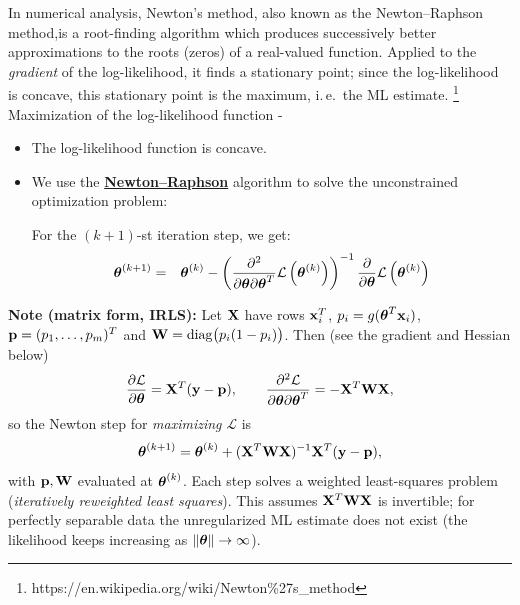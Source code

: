   In numerical analysis, Newton's method, also known as the Newton–Raphson method,is a root-finding algorithm which produces successively better approximations to the roots (zeros) of a real-valued function. Applied to the \emph{gradient} of the log-likelihood, it finds a stationary point; since the log-likelihood is concave, this stationary point is the maximum, i.\,e.\ the ML estimate. \footnote{https://en.wikipedia.org/wiki/Newton\%27s\_method}
 Maximization of the log-likelihood function -
   \begin{itemize}
    \item The log-likelihood function is concave.
    \item We use the \href{http://www.stat.washington.edu/quinn/classes/560/Newton.pdf}{\textbf{Newton--Raphson}} algorithm to solve the unconstrained optimization problem:
    
      For the $(k+1)$-st iteration step, we get:
%
      \begin{eqnarray*}
        \bm{\mathrm{\theta}}^{(k+1)} &=& \bm{\mathrm{\theta}}^{(k)} - \left(  \frac{\partial^2}{\partial\bm{\mathrm{\theta}} \partial \bm{\mathrm{\theta}}^T} \mathcal{L} \left(\bm{\mathrm{\theta}}^{(k)} \right)  \right)^{-1}   
       \frac{\partial}{\partial\bm{\mathrm{\theta}}} \mathcal{L}\left(\bm{\mathrm{\theta}}^{(k)}\right)
      \end{eqnarray*}
  \end{itemize}
  \textbf{Note (matrix form, IRLS):} Let $\mathbf{X}$ have rows $\bm{\mathrm{x}}_i^T$, $p_i=g(\bm{\mathrm{\theta}}^T\bm{\mathrm{x}}_i)$, $\bm{\mathrm{p}}=(p_1,\dots,p_m)^T$ and $\mathbf{W}=\mathrm{diag}\big(p_i(1-p_i)\big)$. Then (see the gradient and Hessian below)
  \begin{displaymath}
    \frac{\partial\mathcal L}{\partial\bm{\mathrm{\theta}}}=\mathbf{X}^T(\bm{\mathrm{y}}-\bm{\mathrm{p}}),\qquad
    \frac{\partial^2\mathcal L}{\partial\bm{\mathrm{\theta}}\partial\bm{\mathrm{\theta}}^T}=-\mathbf{X}^T\mathbf{W}\mathbf{X},
  \end{displaymath}
  so the Newton step for \emph{maximizing} $\mathcal L$ is
  \begin{displaymath}
    \bm{\mathrm{\theta}}^{(k+1)}=\bm{\mathrm{\theta}}^{(k)}+(\mathbf{X}^T\mathbf{W}\mathbf{X})^{-1}\mathbf{X}^T(\bm{\mathrm{y}}-\bm{\mathrm{p}}),
  \end{displaymath}
  with $\bm{\mathrm{p}},\mathbf{W}$ evaluated at $\bm{\mathrm{\theta}}^{(k)}$. Each step solves a weighted least-squares problem (\emph{iteratively reweighted least squares}). This assumes $\mathbf{X}^T\mathbf{W}\mathbf{X}$ is invertible; for perfectly separable data the unregularized ML estimate does not exist (the likelihood keeps increasing as $\|\bm{\mathrm{\theta}}\|\to\infty$).

